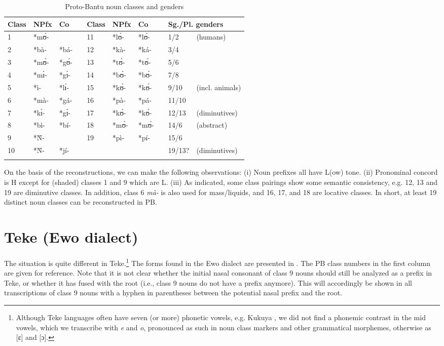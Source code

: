 \documentclass[output=paper,,modfonts,nonflat]{langsci/langscibook}
\begin{document}
\begin{table}[!htbp]
\caption{Proto-Bantu noun classes and genders}
\begin{small}
\label{table1}
\begin{tabular}{l		l		l		l		l		l		l		l	@{\qquad\qquad}	l		l }
\lsptoprule
Class	&	NPfx	&	Co	&		&	Class	&	NPfx	&	Co	&		&	\multicolumn{2}{l}{Sg./Pl. genders}			\\	
\midrule
1	&	*mʊ̀-	&	\higr{*ʊ̀-}	&		&	11	&	*lʊ̀-	&	*lʊ́-	&		&	1/2	&	(humans)	\\	
2	&	*bà-	&	*bá-	&		&	12	&	*kà-	&	*ká-	&		&	3/4	&		\\	
3	&	*mʊ̀-	&	*gʊ́-	&		&	13	&	*tʊ̀-	&	*tʊ́-	&		&	5/6	&		\\	
4	&	*mɪ̀-	&	*gɪ́-	&		&	14	&	*bʊ̀-	&	*bʊ́-	&		&	7/8	&		\\	
5	&	*ì-	&	*lɪ́-	&		&	15	&	*kʊ̀-	&	*kʊ́-	&		&	9/10	&	(incl. animals)	\\	
6	&	*mà-	&	*gá-	&		&	16	&	*pà-	&	*pá-	&		&	11/10	&		\\	
7	&	*kɪ̀-	&	*gɪ́-	&		&	17	&	*kʊ̀-	&	*kʊ́-	&		&	12/13	&	(diminutives)	\\	
8	&	*bì-	&	*bí-	&		&	18	&	*mʊ̀-	&	*mʊ́-	&		&	14/6	&	(abstract)	\\	
9	&	*Ǹ-	&	\higr{*jɪ̀-}	&		&	19	&	*pì-	&	*pí-	&		&	15/6	&		\\	
10	&	*Ǹ-	&	*jí-	&		&		&		&		&		&	19/13?	&	(diminutives)	\\	\lspbottomrule
\end{tabular}
\end{small}
\end{table}


On the basis of the reconstructions, we can make the following observations: (i) Noun prefixes all have L(ow) tone. (ii) Pronominal concord is H except for (shaded) classes 1 and 9 which are L. (iii) As indicated, some class pairings show some semantic consistency, e.g. 12, 13 and 19 are diminutive classes. In addition, class 6 \textit{mà-} is also used for mass/liquids, and 16, 17, and 18 are locative classes. In short, at least 19 distinct noun classes can be reconstructed in PB.

 
\section{Teke (Ewo dialect)} 
\label{3-Teke}

The situation is quite different in Teke.\footnote{Although Teke languages often have seven (or more) phonetic vowels, e.g. Kukuya \citep{paulian1975}, we did not find a phonemic contrast in the mid vowels, which we transcribe with \emph{e} and \emph{o}, pronounced as such in noun class markers and other grammatical morphemes, otherwise as [ɛ] and [ɔ].} The forms found in the Ewo dialect are presented in . The PB class numbers in the first column are given for reference. Note that it is not clear whether the initial nasal consonant of class 9 nouns should still be analyzed as a prefix in Teke, or whether it has fused with the root (i.e., class 9 nouns do not have a prefix anymore). This will accordingly be shown in all transcriptions of class 9 nouns with a hyphen in parentheses between the potential nasal prefix and the root.
\end{document}
